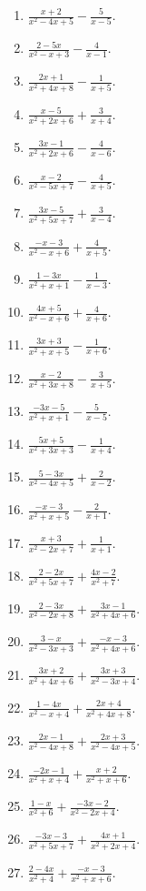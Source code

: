\documentclass[11pt,oneside]{book}
\begin{document}
\begin{enumerate}[leftmargin=*,label=\textbf{U\arabic*.},itemsep=0.45\baselineskip]
\item $\displaystyle \frac{x + 2}{x^{2} - 4 x + 5} - \frac{5}{x - 5}$.
\item $\displaystyle \frac{2 - 5 x}{x^{2} - x + 3} - \frac{4}{x - 1}$.
\item $\displaystyle \frac{2 x + 1}{x^{2} + 4 x + 8} - \frac{1}{x + 5}$.
\item $\displaystyle \frac{x - 5}{x^{2} + 2 x + 6} + \frac{3}{x + 4}$.
\item $\displaystyle \frac{3 x - 1}{x^{2} + 2 x + 6} - \frac{4}{x - 6}$.
\item $\displaystyle \frac{x - 2}{x^{2} - 5 x + 7} - \frac{4}{x + 5}$.
\item $\displaystyle \frac{3 x - 5}{x^{2} + 5 x + 7} + \frac{3}{x - 4}$.
\item $\displaystyle \frac{- x - 3}{x^{2} - x + 6} + \frac{4}{x + 5}$.
\item $\displaystyle \frac{1 - 3 x}{x^{2} + x + 1} - \frac{1}{x - 3}$.
\item $\displaystyle \frac{4 x + 5}{x^{2} - x + 6} + \frac{4}{x + 6}$.
\item $\displaystyle \frac{3 x + 3}{x^{2} + x + 5} - \frac{1}{x + 6}$.
\item $\displaystyle \frac{x - 2}{x^{2} + 3 x + 8} - \frac{3}{x + 5}$.
\item $\displaystyle \frac{- 3 x - 5}{x^{2} + x + 1} - \frac{5}{x - 5}$.
\item $\displaystyle \frac{5 x + 5}{x^{2} + 3 x + 3} - \frac{1}{x + 4}$.
\item $\displaystyle \frac{5 - 3 x}{x^{2} - 4 x + 5} + \frac{2}{x - 2}$.
\item $\displaystyle \frac{- x - 3}{x^{2} + x + 5} - \frac{2}{x + 1}$.
\item $\displaystyle \frac{x + 3}{x^{2} - 2 x + 7} + \frac{1}{x + 1}$.
\item $\displaystyle \frac{2 - 2 x}{x^{2} + 5 x + 7} + \frac{4 x - 2}{x^{2} + 7}$.
\item $\displaystyle \frac{2 - 3 x}{x^{2} - 2 x + 8} + \frac{3 x - 1}{x^{2} + 4 x + 6}$.
\item $\displaystyle \frac{3 - x}{x^{2} - 3 x + 3} + \frac{- x - 3}{x^{2} + 4 x + 6}$.
\item $\displaystyle \frac{3 x + 2}{x^{2} + 4 x + 6} + \frac{3 x + 3}{x^{2} - 3 x + 4}$.
\item $\displaystyle \frac{1 - 4 x}{x^{2} - x + 4} + \frac{2 x + 4}{x^{2} + 4 x + 8}$.
\item $\displaystyle \frac{2 x - 1}{x^{2} - 4 x + 8} + \frac{2 x + 3}{x^{2} - 4 x + 5}$.
\item $\displaystyle \frac{- 2 x - 1}{x^{2} + x + 4} + \frac{x + 2}{x^{2} + x + 6}$.
\item $\displaystyle \frac{1 - x}{x^{2} + 6} + \frac{- 3 x - 2}{x^{2} - 2 x + 4}$.
\item $\displaystyle \frac{- 3 x - 3}{x^{2} + 5 x + 7} + \frac{4 x + 1}{x^{2} + 2 x + 4}$.
\item $\displaystyle \frac{2 - 4 x}{x^{2} + 4} + \frac{- x - 3}{x^{2} + x + 6}$.
\end{enumerate}
\end{document}
